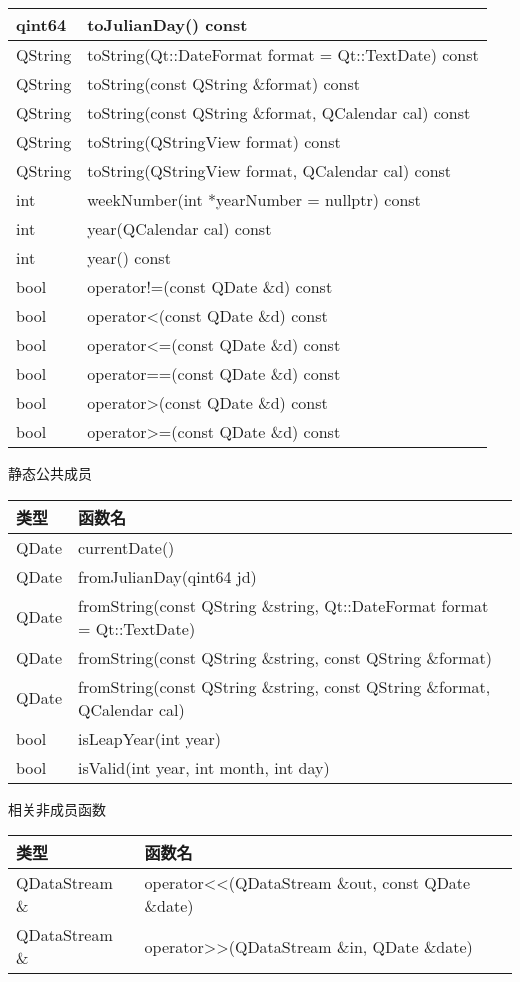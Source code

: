 \begin{longtable}{|l|m{30em}|}
\hline
qint64&	toJulianDay() const\\
\hline
QString&	toString(Qt::DateFormat format = Qt::TextDate) const\\
\hline
QString&	toString(const QString \&format) const\\
\hline
QString&	toString(const QString \&format, QCalendar cal) const\\
\hline
QString&	toString(QStringView format) const\\
\hline
QString&	toString(QStringView format, QCalendar cal) const\\
\hline
int&	weekNumber(int *yearNumber = nullptr) const\\
\hline
int&	year(QCalendar cal) const\\
\hline
int&	year() const\\
\hline
bool&	operator!=(const QDate \&d) const\\
\hline
bool&	operator<(const QDate \&d) const\\
\hline
bool&	operator<=(const QDate \&d) const\\
\hline
bool&	operator==(const QDate \&d) const\\
\hline
bool&	operator>(const QDate \&d) const\\
\hline
bool&	operator>=(const QDate \&d) const\\
\hline
\end{longtable}

静态公共成员

\begin{tabular}{|l|l|}
\hline
类型&	函数名\\
\hline
QDate&	currentDate()\\
\hline
QDate&	fromJulianDay(qint64 jd)\\
\hline
QDate&	fromString(const QString \&string, Qt::DateFormat format = Qt::TextDate)\\
\hline
QDate&	fromString(const QString \&string, const QString \&format)\\
\hline
QDate&	fromString(const QString \&string, const QString \&format, QCalendar cal)\\
\hline
bool&	isLeapYear(int year)\\
\hline
bool&	isValid(int year, int month, int day)\\
\hline
\end{tabular}

\splitLine

相关非成员函数

\begin{tabular}{|l|l|}
\hline
类型&	函数名\\
\hline
QDataStream \& &	operator<<(QDataStream \&out, const QDate \&date) \\
\hline
QDataStream \&	& operator>>(QDataStream \&in, QDate \&date)\\
\hline
\end{tabular}

